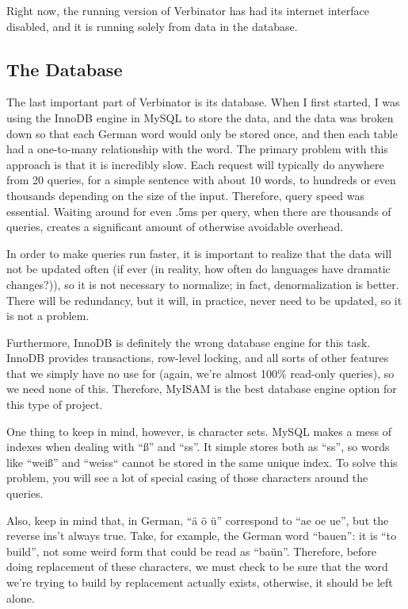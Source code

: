 \documentclass[12pt]{article}
\begin{document}
Right now, the running version of Verbinator has had its internet interface disabled, and it is running
solely from data in the database.

\subsection{The Database}

The last important part of Verbinator is its database. When I first started, I was using the InnoDB
engine in MySQL to store the data, and the data was broken down so that each German word would only
be stored once, and then each table had a one-to-many relationship with the word. The primary problem
with this approach is that it is incredibly slow.  Each request will typically do anywhere from
20 queries, for a simple sentence with about 10 words, to hundreds or even thousands depending on the 
size of the input.  Therefore, query speed was essential.  Waiting around for even .5ms per query, when
there are thousands of queries, creates a significant amount of otherwise avoidable overhead.

In order to make queries run faster, it is important to realize that the data will not be updated
often (if ever (in reality, how often do languages have dramatic changes?)), so it is not necessary
to normalize; in fact, denormalization is better.  There will be redundancy, but it will, in practice,
never need to be updated, so it is not a problem.

Furthermore, InnoDB is definitely the wrong database engine for this task.  InnoDB provides transactions,
row-level locking, and all sorts of other features that we simply have no use for (again, we're
almost 100\% read-only queries), so we need none of this.  Therefore, MyISAM is the best database
engine option for this type of project.

One thing to keep in mind, however, is character sets.  MySQL makes a mess of indexes when dealing with
``\ss'' and ``ss''. It simple stores both as ``ss'', so words like ``wei\ss'' and ``weiss`` cannot
be stored in the same unique index. To solve this problem, you will see a lot of special casing of
those characters around the queries.

Also, keep in mind that, in German, ``\"{a} \"{o} \"{u}'' correspond to ``ae oe ue'', but the reverse
ins't always true.  Take, for example, the German word ``bauen'': it is ``to build'', not some weird
form that could be read as ``ba\"{u}n''. Therefore, before doing replacement of these characters,
we must check to be sure that the word we're trying to build by replacement actually exists, otherwise,
it should be left alone.
\end{document}

